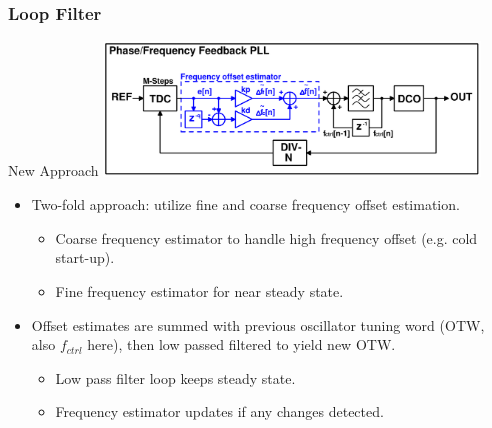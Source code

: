 \documentclass[t, screen, aspectratio=43]{beamer}
\begin{document}
\begin{frame}
	\frametitle{Loop Filter}
	\begin{block}{New Approach}
		\vspace{-0.5em}
		\center\includegraphics[width=0.75\textwidth, angle=0]{more_advanced.pdf}
		\vspace{-0.5em}
		\begin{itemize}
			\footnotesize
			\item Two-fold approach: utilize fine and coarse frequency offset estimation.
			\begin{itemize}
				\scriptsize
				\item Coarse frequency estimator to handle high frequency offset (e.g. cold start-up).	
				\item Fine frequency estimator for near steady state.
			\end{itemize}
			\item Offset estimates are summed with previous oscillator tuning word (OTW, also $f_{ctrl}$ here), then low passed filtered to yield new OTW. 
			\begin{itemize}
				\scriptsize
				\item Low pass filter loop keeps steady state.	
				\item Frequency estimator updates if any changes detected.
			\end{itemize}			
		\end{itemize} 	
	\end{block}
\end{frame}
\end{document}

